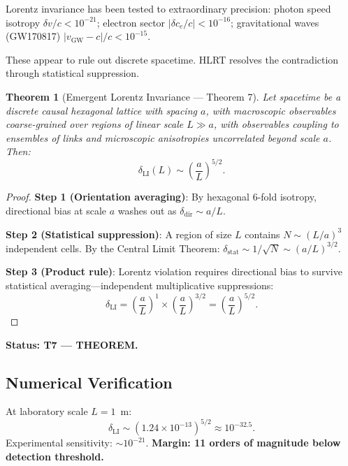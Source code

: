\documentclass[11pt,letterpaper]{article}
\newtheorem{theorem}{Theorem}[section]
\begin{document}
Lorentz invariance has been tested to extraordinary precision:
photon speed isotropy $\delta v/c < 10^{-21}$;
electron sector $|\delta c_e/c| < 10^{-16}$;
gravitational waves (GW170817) $|v_\mathrm{GW}-c|/c < 10^{-15}$.

These appear to rule out discrete spacetime.  HLRT resolves the contradiction
through statistical suppression.

\begin{theorem}[Emergent Lorentz Invariance --- Theorem 7]\label{thm:T7}
Let spacetime be a discrete causal hexagonal lattice with spacing $a$,
with macroscopic observables coarse-grained over regions of linear scale
$L\gg a$, with observables coupling to ensembles of links and microscopic
anisotropies uncorrelated beyond scale $a$.  Then:
\begin{equation}
  \boxed{\delta_\mathrm{LI}(L) \sim \left(\frac{a}{L}\right)^{5/2}.}
\end{equation}
\end{theorem}

\begin{proof}
\textbf{Step 1 (Orientation averaging)}: By hexagonal 6-fold isotropy,
directional bias at scale $a$ washes out as $\delta_\mathrm{dir}\sim a/L$.

\textbf{Step 2 (Statistical suppression)}: A region of size $L$ contains
$N\sim(L/a)^3$ independent cells.  By the Central Limit Theorem:
$\delta_\mathrm{stat}\sim1/\sqrt{N}\sim(a/L)^{3/2}$.

\textbf{Step 3 (Product rule)}: Lorentz violation requires directional
bias to survive statistical averaging---independent multiplicative
suppressions:
\begin{equation}
  \delta_\mathrm{LI} = \left(\frac{a}{L}\right)^1 \times
                       \left(\frac{a}{L}\right)^{3/2}
                     = \left(\frac{a}{L}\right)^{5/2}.
\end{equation}
\end{proof}

\textbf{Status: T7 --- THEOREM.}

\subsection{Numerical Verification}

At laboratory scale $L=1$~m:
\begin{equation}
  \delta_\mathrm{LI} \sim (1.24\times10^{-13})^{5/2} \approx 10^{-32.5}.
\end{equation}
Experimental sensitivity: $\sim10^{-21}$.
\textbf{Margin: 11 orders of magnitude below detection threshold.}
\end{document}

